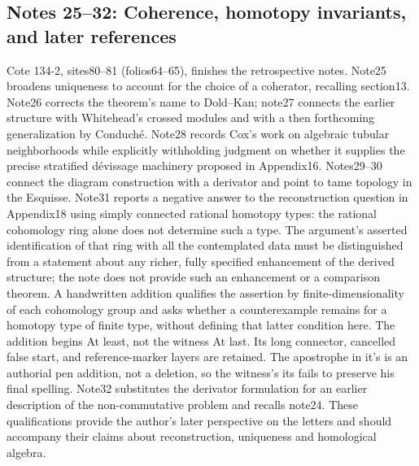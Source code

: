 \documentclass[10pt,oneside]{book}
\begin{document}
\subsection*{Notes 25--32: Coherence, homotopy invariants, and later references}
Cote 134-2, sites80--81 (folios64--65), finishes the retrospective notes. Note25 broadens uniqueness to account for the choice of a coherator, recalling section13. Note26 corrects the theorem's name to Dold--Kan; note27 connects the earlier structure with Whitehead's crossed modules and with a then forthcoming generalization by Conduché. Note28 records Cox's work on algebraic tubular neighborhoods while explicitly withholding judgment on whether it supplies the precise stratified dévissage machinery proposed in Appendix16. Notes29--30 connect the diagram construction with a derivator and point to tame topology in the Esquisse. Note31 reports a negative answer to the reconstruction question in Appendix18 using simply connected rational homotopy types: the rational cohomology ring alone does not determine such a type. The argument's asserted identification of that ring with all the contemplated data must be distinguished from a statement about any richer, fully specified enhancement of the derived structure; the note does not provide such an enhancement or a comparison theorem. A handwritten addition qualifies the assertion by finite-dimensionality of each cohomology group and asks whether a counterexample remains for a homotopy type of finite type, without defining that latter condition here. The addition begins At least, not the witness At last. Its long connector, cancelled false start, and reference-marker layers are retained. The apostrophe in it's is an authorial pen addition, not a deletion, so the witness's its fails to preserve his final spelling. Note32 substitutes the derivator formulation for an earlier description of the non-commutative problem and recalls note24. These qualifications provide the author's later perspective on the letters and should accompany their claims about reconstruction, uniqueness and homological algebra.
\end{document}
